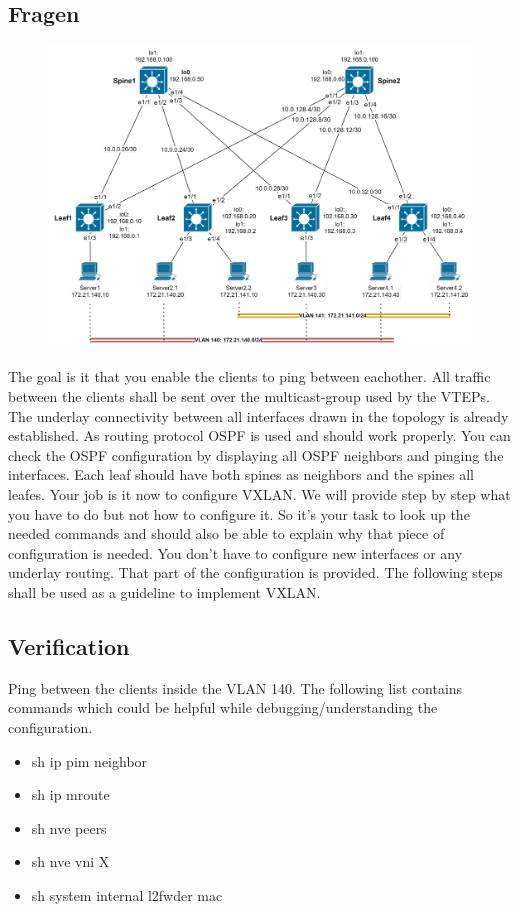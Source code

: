 \documentclass[11pt,titlepage]{article}
\newenvironment{shadedquotation}
 {\begin{shaded*}
  \quoting[leftmargin=0pt, vskip=0pt]
 }
 {\endquoting
 \end{shaded*}
}
\begin{document}
\subsection{Fragen}
\label{sec:Fragen}
\begin{figure}[H]
	\centering
	\includegraphics[width=0.9\linewidth]{images/topology}
	\caption{}
	\label{fig:topology}
\end{figure}
The goal is it that you enable the clients to ping between eachother. All traffic between the
clients shall be sent over the multicast-group used by the VTEPs.
The underlay connectivity between all interfaces drawn in the topology is already established.
As routing protocol OSPF is used and should work properly. You can check the OSPF configuration
by displaying all OSPF neighbors and pinging the interfaces. Each leaf should have both
spines as neighbors and the spines all leafes. Your job is it now to configure VXLAN. We will
provide step by step what you have to do but not how to configure it. So it’s your task to look
up the needed commands and should also be able to explain why that piece of configuration is needed. You don’t have to configure new interfaces or any underlay routing. That part of the
configuration is provided. The following steps shall be used as a guideline to implement VXLAN.


\subsection{Verification}
\label{subsec:Verification}
\begin{shadedquotation}
  Ping between the clients inside the VLAN 140.
  The following list contains commands which could be helpful while debugging/understanding   the configuration.
  \begin{itemize}
  	\item sh ip pim neighbor
  	\item sh ip mroute
  	\item sh nve peers
  	\item sh nve vni X
  	\item sh system internal l2fwder mac
  \end{itemize}
\end{shadedquotation}
\end{document}
